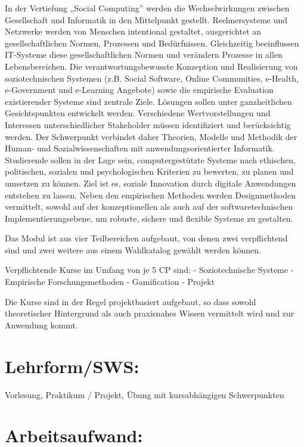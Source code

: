 In der Vertiefung „Social Computing'' werden die Wechselwirkungen
zwischen Gesellschaft und Informatik in den Mittelpunkt gestellt.
Rechnersysteme und Netzwerke werden von Menschen intentional gestaltet,
ausgerichtet an gesellschaftlichen Normen, Prozessen und Bedürfnissen.
Gleichzeitig beeinflussen IT-Systeme diese gesellschaftlichen Normen und
verändern Prozesse in allen Lebensbereichen. Die verantwortungsbewusste
Konzeption und Realisierung von soziotechnischen Systemen (z.B. Social
Software, Online Communities, e-Health, e-Government und e-Learning
Angebote) sowie die empirische Evaluation existierender Systeme sind
zentrale Ziele. Lösungen sollen unter ganzheitlichen Gesichtspunkten
entwickelt werden. Verschiedene Wertvorstellungen und Interessen
unterschiedlicher Stakeholder müssen identifiziert und berücksichtig
werden. Der Schwerpunkt verbindet daher Theorien, Modelle und Methodik
der Human- und Sozialwissenschaften mit anwendungsorientierter
Informatik. Studierende sollen in der Lage sein, computergestützte
Systeme nach ethischen, politischen, sozialen und psychologischen
Kriterien zu bewerten, zu planen und umsetzen zu können. Ziel ist es,
soziale Innovation durch digitale Anwendungen entstehen zu lassen. Neben
den empirischen Methoden werden Designmethoden vermittelt, sowohl auf
der konzeptionellen als auch auf der softwaretechnischen
Implementierungsebene, um robuste, sichere und flexible Systeme zu
gestalten.

Das Modul ist aus vier Teilbereichen aufgebaut, von denen zwei
verpflichtend sind und zwei weitere aus einem Wahlkatalog gewählt werden
können.

Verpflichtende Kurse im Umfang von je 5 CP sind: - Soziotechnische
Systeme - Empirische Forschungsmethoden - Gamification - Projekt

Die Kurse sind in der Regel projektbasiert aufgebaut, so dass sowohl
theoretischer Hintergrund als auch praxisnahes Wissen vermittelt wird
und zur Anwendung kommt.

\section{Lehrform/SWS:}\label{lehrformsws-31}

Vorlesung, Praktikum / Projekt, Übung mit kursabhängigen Schwerpunkten

\section{Arbeitsaufwand:}\label{arbeitsaufwand-30}


